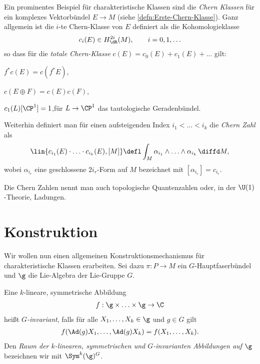\documentclass[%
	paper=a5,%
	fleqn,%
	DIV=18,%
	BCOR=0mm,
	fontsize=11pt,
	titlepage=false,%
	bibliography=totoc,
	DIV=18,%
	twoside=true,
	pdftitle=Riemannsche Geometrie,
	pdfauthor=Uwe Semmelmann,
	numbers=noendperiod]%
	{scrbook}
\begin{document}
\begin{ex}
Ein prominentes Beispiel für charakteristische Klassen sind die \emph{Chern
Klassen} für ein komplexes Vektorbündel $E\to M$ (siehe
\ref{defn:Erste-Chern-Klasse}). Ganz allgemein ist die $i$-te
Chern-Klasse von $E$ definiert als die Kohomologieklasse
\begin{align*}
c_i(E)\in H_\dR^{2i}(M),\qquad i =0,1,\ldots 
\end{align*}
so dass für die \emph{totale Chern-Klasse} $c(E) = c_0(E) + c_1(E) + \ldots$
gilt:
\begin{defnenum}
\item $f^*c(E) = c(f^*E)$,
\item $c(E\oplus F) = c(E)c(F)$,
\item $c_1(L) [\CP^1] = 1$,\quad für $L\to \CP^1$ das tautologische
Geradenbündel.
\end{defnenum}

Weiterhin definiert man für einen aufsteigenden Index $i_1 < \ldots < i_k$
die \emph{Chern Zahl} als
\begin{align*}
\lin{c_{i_1}(E)\cdot \ldots \cdot c_{i_k}(E),[M]}
\defl
\int_M \alpha_{i_1}\wedge \ldots \wedge \alpha_{i_k}\, \diffd M,
\end{align*}
wobei $\alpha_{i_r}$ eine geschlossene $2i_r$-Form auf $M$ bezeichnet mit
$[\alpha_{i_r}] = c_{i_r}$.

Die Chern Zahlen nennt man auch topologische Quantenzahlen oder, in der
$\U(1)$-Theorie, Ladungen.\bsp
\end{ex}

\section{Konstruktion}

Wir wollen nun einen allgemeinen Konstruktionsmechanismus für charakteristische
Klassen erarbeiten. Sei dazu $\pi: P\to M$ ein $G$-Hauptfaserbündel und $\g$ die
Lie-Algebra der Lie-Gruppe $G$.

\begin{defn}
Eine $k$-lineare, symmetrische Abbildung
\begin{align*}
f : \g\times \ldots \times \g \to \C
\end{align*}
heißt \emph{$G$-invariant}, falls für alle $X_1,\ldots,X_k\in \g$ und $g\in G$
gilt
\begin{align*}
f(\Ad(g)X_1,\ldots,\Ad(g)X_k) = f(X_1,\ldots,X_k).
\end{align*}
Den \emph{Raum der $k$-linearen, symmetrischen und $G$-invarianten Abbildungen
auf $\g$} bezeichnen wir mit \emph{$\Sym^k(\g)^G$}.\fish
\end{defn}
\end{document}
